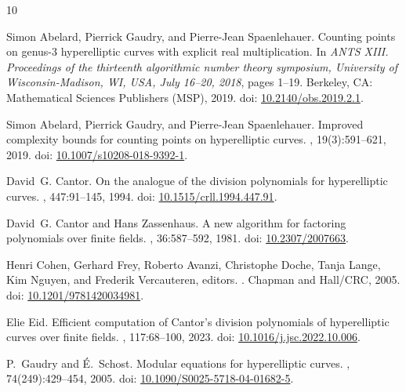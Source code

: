 \documentclass[11pt,a4paper]{article}
\theoremstyle{plain}
\theoremstyle{definition}
\theoremstyle{remark}
\begin{document}
%
%
\begin{thebibliography}{10}

Simon Abelard, Pierrick Gaudry, and Pierre-Jean Spaenlehauer.
\newblock Counting points on genus-3 hyperelliptic curves with explicit real
  multiplication.
\newblock In {\em ANTS XIII. Proceedings of the thirteenth algorithmic number
  theory symposium, University of Wisconsin-Madison, WI, USA, July 16--20,
  2018}, pages 1--19. Berkeley, CA: Mathematical Sciences Publishers (MSP),
  2019.
\newblock doi:
  \href{https://doi.org/10.2140/obs.2019.2.1}{10.2140/obs.2019.2.1}.

Simon Abelard, Pierrick Gaudry, and Pierre-Jean Spaenlehauer.
\newblock Improved complexity bounds for counting points on hyperelliptic
  curves.
, 19(3):591--621, 2019.
\newblock doi:
  \href{https://doi.org/10.1007/s10208-018-9392-1}{10.1007/s10208-018-9392-1}.

David~G. Cantor.
\newblock On the analogue of the division polynomials for hyperelliptic curves.
, 447:91--145, 1994.
\newblock doi:
  \href{https://doi.org/10.1515/crll.1994.447.91}{10.1515/crll.1994.447.91}.

David~G. Cantor and Hans Zassenhaus.
\newblock A new algorithm for factoring polynomials over finite fields.
, 36:587--592, 1981.
\newblock doi: \href{https://doi.org/10.2307/2007663}{10.2307/2007663}.

Henri Cohen, Gerhard Frey, Roberto Avanzi, Christophe Doche, Tanja Lange, Kim
  Nguyen, and Frederik Vercauteren, editors.
.
\newblock Chapman and Hall/CRC, 2005.
\newblock doi:
  \href{https://doi.org/10.1201/9781420034981}{10.1201/9781420034981}.

Elie Eid.
\newblock Efficient computation of {Cantor}'s division polynomials of
  hyperelliptic curves over finite fields.
, 117:68--100, 2023.
\newblock doi:
  \href{https://doi.org/10.1016/j.jsc.2022.10.006}{10.1016/j.jsc.2022.10.006}.

P.~Gaudry and {\'E}.~Schost.
\newblock Modular equations for hyperelliptic curves.
, 74(249):429--454, 2005.
\newblock doi:
  \href{https://doi.org/10.1090/S0025-5718-04-01682-5}{10.1090/S0025-5718-04-01682-5}.


\end{thebibliography}
\end{document}
